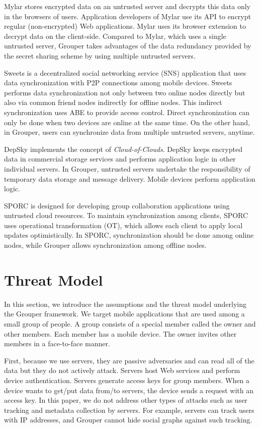 \documentclass{sig-alternate-05-2015}
\begin{document}
Mylar\cite{popa2014building} stores encrypted data on an untrusted server and decrypts this data only in the browsers of users. 
Application developers of Mylar use its API to encrypt regular (non-encrypted) Web applications. 
Mylar uses its browser extension to decrypt data on the client-side. 
Compared to Mylar, which uses a single untrusted server, Grouper takes advantages of the data redundancy provided by the secret sharing scheme by using multiple untrusted servers.

Sweets\cite{sweets} is a decentralized social networking service (SNS) application that uses data synchronization with P2P connections among mobile devices. 
Sweets performs data synchronization not only between two online nodes directly but also via common friend nodes indirectly for offline nodes.
This indirect synchronization uses ABE to provide access control.
Direct synchronization can only be done when two devices are online at the same time. 
On the other hand, in Grouper, users can synchronize data from multiple untrusted servers, anytime.

DepSky\cite{bessani2013depsky} implements the concept of \emph{Cloud-of-Clouds}.  
DepSky keeps encrypted data in commercial storage services and performs application logic in other individual servers.
In Grouper, untrusted servers undertake the responsibility of temporary data storage and message delivery.
Mobile devices perform application logic.

SPORC\cite{feldman2010sporc} is designed for developing group collaboration applications using untrusted cloud resources.
To maintain synchronization among clients, SPORC uses operational transformation (OT), which allows each client to apply local updates optimistically.
In SPORC, synchronization should be done among online nodes, while Grouper allows synchronization among offline nodes.

\section{Threat Model}

In this section, we introduce the assumptions and the threat model underlying the Grouper framework.
We target mobile applications that are used among a small group of people.
A group consists of a special member called the owner and other members.
Each member has a mobile device.
The owner invites other members in a face-to-face manner.

First, because we use servers, they are passive adversaries and can read all of the data but they do not actively attack.
Servers host Web services and perform device authentication.
Servers generate access keys for group members. 
When a device wants to get/put data from/to servers, the device sends a request with an access key.
In this paper, we do not address other types of attacks such as user tracking and metadata collection by servers. 
For example, servers can track users with IP addresses, and Grouper cannot hide social graphs against such tracking.
\end{document}
